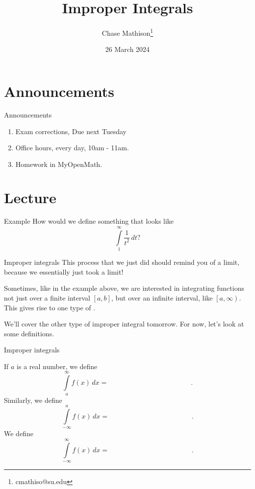\documentclass[presentation]{beamer}
\institute[SU]{Shenandoah University}
\author{Chase Mathison\thanks{cmathiso@su.edu}}
\date{26 March 2024}
\title{Improper Integrals}
\begin{document}
\maketitle

\section{Announcements}
\label{sec:orga2317fb}
\begin{frame}[label={sec:org4355fcb}]{Announcements}
\begin{enumerate}
\item Exam corrections, Due next Tuesday
\item Office hours, every day, 10am - 11am.
\item Homework in MyOpenMath.
\end{enumerate}
\end{frame}

\section{Lecture}
\label{sec:org102de56}
\begin{frame}[label={sec:org89ccb9e}]{Example}
How would we define something that looks like
\[
\int\limits_1^{\infty} \frac{1}{t^2}\,dt?\]
\vspace{10in}
\end{frame}

\begin{frame}[label={sec:org18e2d19}]{Improper integrals}
This process that we just did should remind you of a limit, because we
essentially just took a limit!

Sometimes, like in the example above, we are interested in integrating
functions not just over a finite interval \(\left[ a,b \right]\), but
over an infinite interval, like \(\left[ a,\infty \right)\).  This
gives rise to one type of \uline{\hspace{1in}}.

We'll cover the other type of improper integral tomorrow.  For now,
let's look at some definitions.
\end{frame}

\begin{frame}[label={sec:org3b42398}]{Improper integrals}
\begin{definition}
If \(a\) is a real number, we define
\[
\int\limits_a^{\infty} f(x)\,dx = \hspace{2in}.\]
Similarly, we define
\[
\int\limits_{-\infty}^a f(x)\,dx = \hspace{2in}.\]
We define
\[
\int\limits_{-\infty}^{\infty} f(x)\,dx = \hspace{2in}.\]
\end{definition}
\end{frame}
\end{document}
